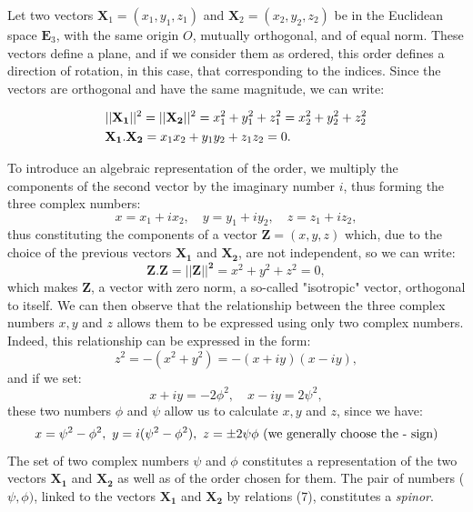 \documentclass[12pt]{article}
\theoremstyle{définition}
\theoremstyle{remark}
\theoremstyle{plain}
\theoremstyle{plain}
\begin{document}
Let two vectors $\mathbf{X}_1= (x_1, y_1, z_1)$ and $\mathbf{X}_2= (x_2, y_2, z_2)$ be in the Euclidean space $\mathbf{E}_3$, with the same origin $O$, mutually orthogonal, and of equal norm. These vectors define a plane, and if we consider them as ordered, this order defines a direction of rotation, in this case, that corresponding to the indices. Since the vectors are orthogonal and have the same magnitude, we can write:

\begin{align}
&||\mathbf{X_1}||^2 = ||\mathbf{X_2}||^2 = x_1^2+ y_1^2+ z_1^2 = x_2^2+y_2^2+z_2^2 \notag\\
& \mathbf{X_1.X_2} = x_1x_2+ y_1y_2+ z_1z_2 = 0.
\end{align}

To introduce an algebraic representation of the order, we multiply the components of the second vector by the imaginary number $i$, thus forming the three complex numbers:
\[
x = x_1+ix_2, \quad y = y_1+iy_2, \quad z = z_1+iz_2,
\]
thus constituting the components of a vector $\mathbf{Z} = (x, y, z)$ which, due to the choice of the previous vectors $\mathbf{X_1}$ and $\mathbf{X_2}$, are not independent, so we can write:
\[
\mathbf{Z.Z = ||Z||^2} = x^2+y^2+z^2 = 0,
\]
which makes $\mathbf{Z}$, a vector with zero norm, a so-called "isotropic" vector, orthogonal to itself.
We can then observe that the relationship between the three complex numbers $x, y$ and $z$ allows them to be expressed using only two complex numbers. Indeed, this relationship can be expressed in the form:
\[
z^2 = -(x^2+y^2) = -(x+iy)(x-iy),
\]
and if we set:
\[
x +iy = -2 \phi^2, \quad x -iy = 2 \psi^2,
\]
these two numbers $\phi$ and $\psi$ allow us to calculate $x, y$ and $z$, since we have:
\begin{equation}
x = \psi^2-\phi^2, \ y = i(\psi^2-\phi^2), \ z = \pm 2 \psi\phi \ \textnormal{(we generally choose the - sign)}
\end{equation}
The set of two complex numbers $\psi$ and $\phi$ constitutes a representation of the two vectors $\mathbf{X_1}$ and $\mathbf{X_2}$ as well as of the order chosen for them. The pair of numbers ($\psi,\phi)$, linked to the vectors $\mathbf{X_1}$ and $\mathbf{X_2}$ by relations (7), constitutes a {\it spinor}.
\end{document}
